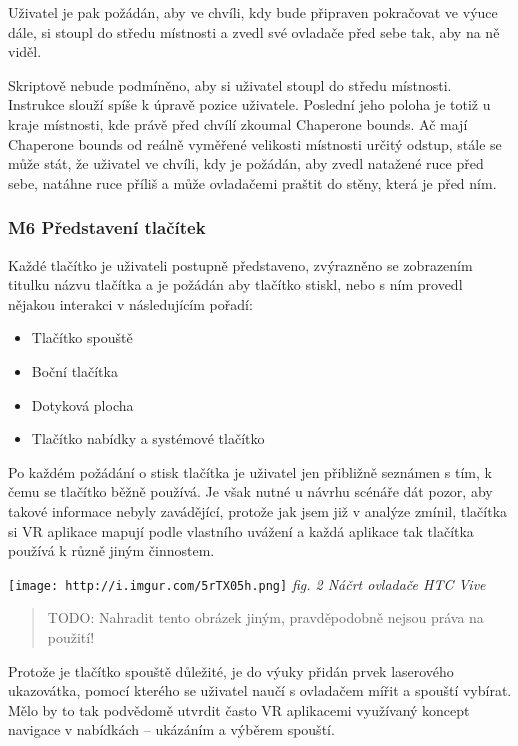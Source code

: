 Uživatel je pak požádán, aby ve chvíli, kdy bude připraven pokračovat ve
výuce dále, si stoupl do středu místnosti a zvedl své ovladače před sebe
tak, aby na ně viděl.

Skriptově nebude podmíněno, aby si uživatel stoupl do středu místnosti.
Instrukce slouží spíše k úpravě pozice uživatele. Poslední jeho poloha
je totiž u kraje místnosti, kde právě před chvílí zkoumal Chaperone
bounds. Ač mají Chaperone bounds od reálně vyměřené velikosti místnosti
určitý odstup, stále se může stát, že uživatel ve chvíli, kdy je
požádán, aby zvedl natažené ruce před sebe, natáhne ruce příliš a může
ovladačemi praštit do stěny, která je před ním.

\subsubsection{M6 Představení
tlačítek}\label{m6-pux159edstavenuxed-tlaux10duxedtek}

Každé tlačítko je uživateli postupně představeno, zvýrazněno se
zobrazením titulku názvu tlačítka a je požádán aby tlačítko stiskl, nebo
s ním provedl nějakou interakci v následujícím pořadí:

\begin{itemize}
\tightlist
\item
  Tlačítko spouště
\item
  Boční tlačítka
\item
  Dotyková plocha
\item
  Tlačítko nabídky a systémové tlačítko
\end{itemize}

Po každém požádání o stisk tlačítka je uživatel jen přibližně seznámen s
tím, k čemu se tlačítko běžně používá. Je však nutné u návrhu scénáře
dát pozor, aby takové informace nebyly zavádějící, protože jak jsem již
v analýze zmínil, tlačítka si VR aplikace mapují podle vlastního uvážení
a každá aplikace tak tlačítka používá k různě jiným činnostem.

\texttt{[image: http://i.imgur.com/5rTX05h.png]} \emph{fig. 2 Náčrt
ovladače HTC Vive}

\begin{quote}
TODO: Nahradit tento obrázek jiným, pravděpodobně nejsou práva na
použití!
\end{quote}

Protože je tlačítko spouště důležité, je do výuky přidán prvek
laserového ukazovátka, pomocí kterého se uživatel naučí s ovladačem
mířit a spouští vybírat. Mělo by to tak podvědomě utvrdit často VR
aplikacemi využívaný koncept navigace v nabídkách -- ukázáním a výběrem
spouští.

